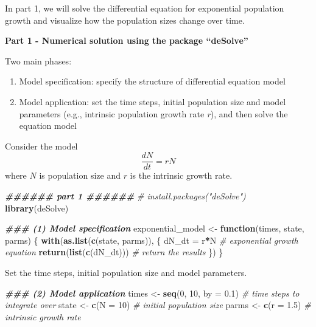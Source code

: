 \documentclass[
]{book}
\newenvironment{Shaded}{\begin{snugshade}}{\end{snugshade}}
\newcommand{\AttributeTok}[1]{\textcolor[rgb]{0.13,0.29,0.53}{#1}}
\newcommand{\CommentTok}[1]{\textcolor[rgb]{0.56,0.35,0.01}{\textit{#1}}}
\newcommand{\ControlFlowTok}[1]{\textcolor[rgb]{0.13,0.29,0.53}{\textbf{#1}}}
\newcommand{\DecValTok}[1]{\textcolor[rgb]{0.00,0.00,0.81}{#1}}
\newcommand{\DocumentationTok}[1]{\textcolor[rgb]{0.56,0.35,0.01}{\textbf{\textit{#1}}}}
\newcommand{\FloatTok}[1]{\textcolor[rgb]{0.00,0.00,0.81}{#1}}
\newcommand{\FunctionTok}[1]{\textcolor[rgb]{0.13,0.29,0.53}{\textbf{#1}}}
\newcommand{\NormalTok}[1]{#1}
\newcommand{\OtherTok}[1]{\textcolor[rgb]{0.56,0.35,0.01}{#1}}
\newcommand{\SpecialCharTok}[1]{\textcolor[rgb]{0.81,0.36,0.00}{\textbf{#1}}}
\begin{document}
In part 1, we will solve the differential equation for exponential population growth and visualize how the population sizes change over time.

\textbf{Part 1 - Numerical solution using the package ``deSolve''}

Two main phases:

\begin{enumerate}
\def\labelenumi{(\arabic{enumi})}
\item
  Model specification: specify the structure of differential equation model
\item
  Model application: set the time steps, initial population size and model parameters (e.g., intrinsic population growth rate \emph{r}), and then solve the equation model
\end{enumerate}

Consider the model
\[
\frac{dN}{dt} = rN
\]
where \(N\) is population size and \(r\) is the intrinsic growth rate.

\begin{Shaded}
\begin{Highlighting}[]
\DocumentationTok{\#\#\#\#\#\# part 1 \#\#\#\#\#\#}
\CommentTok{\# install.packages("deSolve")}
\FunctionTok{library}\NormalTok{(deSolve)}

\DocumentationTok{\#\#\# (1) Model specification}
\NormalTok{exponential\_model }\OtherTok{\textless{}{-}} \ControlFlowTok{function}\NormalTok{(times, state, parms) \{}
  \FunctionTok{with}\NormalTok{(}\FunctionTok{as.list}\NormalTok{(}\FunctionTok{c}\NormalTok{(state, parms)), \{}
\NormalTok{    dN\_dt }\OtherTok{=}\NormalTok{ r}\SpecialCharTok{*}\NormalTok{N  }\CommentTok{\# exponential growth equation}
    \FunctionTok{return}\NormalTok{(}\FunctionTok{list}\NormalTok{(}\FunctionTok{c}\NormalTok{(dN\_dt)))  }\CommentTok{\# return the results}
\NormalTok{  \})}
\NormalTok{\}}
\end{Highlighting}
\end{Shaded}

Set the time steps, initial population size and model parameters.

\begin{Shaded}
\begin{Highlighting}[]
\DocumentationTok{\#\#\# (2) Model application}
\NormalTok{times }\OtherTok{\textless{}{-}} \FunctionTok{seq}\NormalTok{(}\DecValTok{0}\NormalTok{, }\DecValTok{10}\NormalTok{, }\AttributeTok{by =} \FloatTok{0.1}\NormalTok{)  }\CommentTok{\# time steps to integrate over}
\NormalTok{state }\OtherTok{\textless{}{-}} \FunctionTok{c}\NormalTok{(}\AttributeTok{N =} \DecValTok{10}\NormalTok{)  }\CommentTok{\# initial population size}
\NormalTok{parms }\OtherTok{\textless{}{-}} \FunctionTok{c}\NormalTok{(}\AttributeTok{r =} \FloatTok{1.5}\NormalTok{)  }\CommentTok{\# intrinsic growth rate}
\end{Highlighting}
\end{Shaded}
\end{document}
